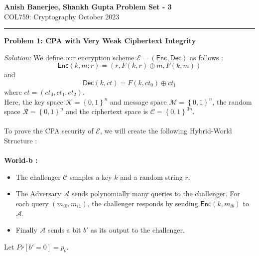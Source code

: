 \documentclass[a4paper, 11pt]{article}
\newcommand{\hr}{\noindent\rule{7in}{2.8pt}}
\newenvironment{solution}
    {\textit{Solution:}}
    {\clearpage}
\newcommand{\prob}[1]{\begin{mdframed}[backgroundcolor=gray!20] \textbf{Problem #1}\end{mdframed}}
\newcommand{\bit}{\left\{0, 1\right\}}
\newcommand{\enc}{\mathsf{Enc}}
\newcommand{\calA}{\mathcal{A}}
\newcommand{\calC}{\mathcal{C}}
\newcommand{\calE}{\mathcal{E}}
\newcommand{\calK}{\mathcal{K}}
\newcommand{\calM}{\mathcal{M}}
\newcommand{\calR}{\mathcal{R}}
\newcommand{\calT}{\mathcal{T}}
\begin{document}
\noindent
\large\textbf{Anish Banerjee, Shankh Gupta} \hfill \textbf{Problem Set - 3}   \\
\normalsize COL759: Cryptography \hfill October 2023\\
\hr


\prob{1: CPA with Very Weak Ciphertext Integrity}
\begin{solution}
    We define our encryption scheme $\calE = (\mathsf{Enc, Dec})$  as follows : 
    $$\mathsf{Enc}(k, m; r) = (r, F(k, r) \oplus m, F(k, m))$$ and
    $$\mathsf{Dec}(k, ct) = F(k, ct_0) \oplus ct_1$$ where $ct = (ct_0, ct_1, ct_2)$. \\
    Here, the key space $\calK = \bit^n$ and message space $\calM = \bit^n$, the random space $\calR = \bit^n$ and the ciphertext space is $\calC = \bit^{3n}$. \\ \\
    To prove the CPA security of $\calE$, we will create the following Hybrid-World Structure : \\ \\
    \textbf{World-b :} 
        \begin{itemize}
            \item The challenger $\calC$ samples a key $k$ and a random string $r$.
            \item The Adversary $\calA$ sends polynomially many queries to the challenger. For each query $(m_{i0}, m_{i1})$, the challenger responds by sending $\enc(k, m_{ib})$ to $\calA$.
            \item Finally $\calA$ sends a bit $b'$ as its output to the challenger.
        \end{itemize}
    Let $Pr[b' = 0] = p_b$. \\ \\

\end{solution}
\end{document}
